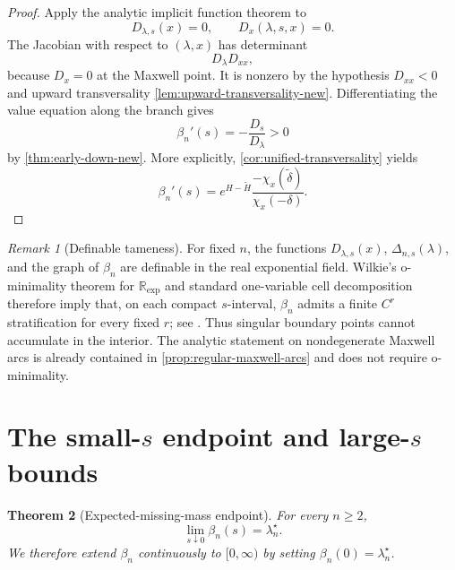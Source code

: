 \documentclass[11pt]{article}
\theoremstyle{plain}
\newtheorem{theorem}{Theorem}[section]
\theoremstyle{definition}
\theoremstyle{remark}
\newtheorem{remark}[theorem]{Remark}
\newcommand{\R}{\mathbb R}
\begin{document}
\begin{proof}
Apply the analytic implicit function theorem to
\[
D_{\lambda,s}(x)=0,
\qquad
D_x(\lambda,s,x)=0.
\]
The Jacobian with respect to \((\lambda,x)\) has determinant
\[
D_\lambda D_{xx},
\]
because \(D_x=0\) at the Maxwell point.  It is nonzero by the hypothesis \(D_{xx}<0\) and upward transversality \cref{lem:upward-transversality-new}.  Differentiating the value equation along the branch gives
\[
\beta_n'(s)=-\frac{D_s}{D_\lambda}>0
\]
by \cref{thm:early-down-new}.  More explicitly, \cref{cor:unified-transversality} yields
\begin{equation}\label{eq:beta-slope-chi}
\beta_n'(s)
=e^{H-\widetilde H}
\frac{-\chi_x(\widetilde\delta)}{\chi_x(-\delta)}.
\end{equation}
\end{proof}

\begin{remark}[Definable tameness]\label{rem:definable}
For fixed \(n\), the functions \(D_{\lambda,s}(x)\), \(\Delta_{n,s}(\lambda)\), and the graph of \(\beta_n\) are definable in the real exponential field.  Wilkie's o-minimality theorem for \(\R_{\exp}\) and standard one-variable cell decomposition therefore imply that, on each compact \(s\)-interval, \(\beta_n\) admits a finite \(C^r\) stratification for every fixed \(r\); see \cite{Wilkie1996,vanDenDries1998}.  Thus singular boundary points cannot accumulate in the interior.  The analytic statement on nondegenerate Maxwell arcs is already contained in \cref{prop:regular-maxwell-arcs} and does not require o-minimality.
\end{remark}

\section{The small-\texorpdfstring{$s$}{s} endpoint and large-\texorpdfstring{$s$}{s} bounds}

\begin{theorem}[Expected-missing-mass endpoint]\label{thm:beta-zero-new}
For every \(n\ge2\),
\begin{equation}\label{eq:beta-zero-new}
\lim_{s\downarrow0}\beta_n(s)=\lambda_n^\star.
\end{equation}
We therefore extend \(\beta_n\) continuously to \([0,\infty)\) by setting \(\beta_n(0)=\lambda_n^\star\).
\end{theorem}
\end{document}
